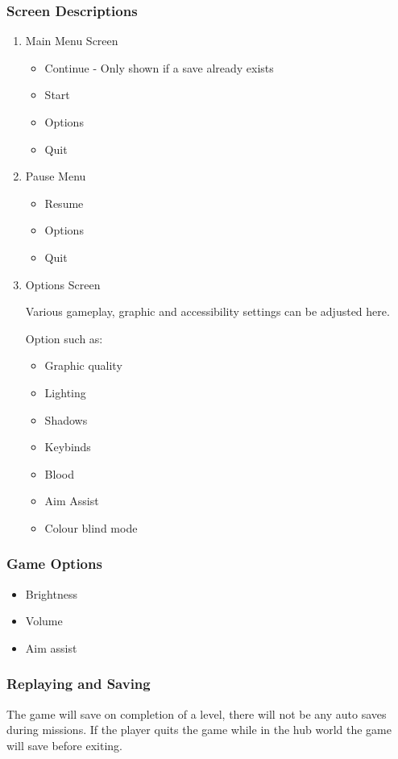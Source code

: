 \documentclass{article}
\begin{document}
\subsubsection{Screen Descriptions}
\label{sec:org3132821}
\begin{enumerate}
\item Main Menu Screen
\label{sec:org9127116}

\begin{itemize}
\item Continue - Only shown if a save already exists
\item Start
\item Options
\item Quit
\end{itemize}
\item Pause Menu
\label{sec:orge8dcca0}

\begin{itemize}
\item Resume
\item Options
\item Quit
\end{itemize}
\item Options Screen
\label{sec:orgfcd5dcb}

Various gameplay, graphic and accessibility settings can be adjusted here.

Option such as:
\begin{itemize}
\item Graphic quality
\item Lighting
\item Shadows
\item Keybinds
\item Blood
\item Aim Assist
\item Colour blind mode
\end{itemize}
\end{enumerate}
\subsubsection{Game Options}
\label{sec:org7d4acc9}
\begin{itemize}
\item Brightness
\item Volume
\item Aim assist
\end{itemize}
\subsubsection{Replaying and Saving}
\label{sec:orge087666}
The game will save on completion of a level, there will not be any auto saves during missions.
If the player quits the game while in the hub world the game will save before exiting.
\end{document}
